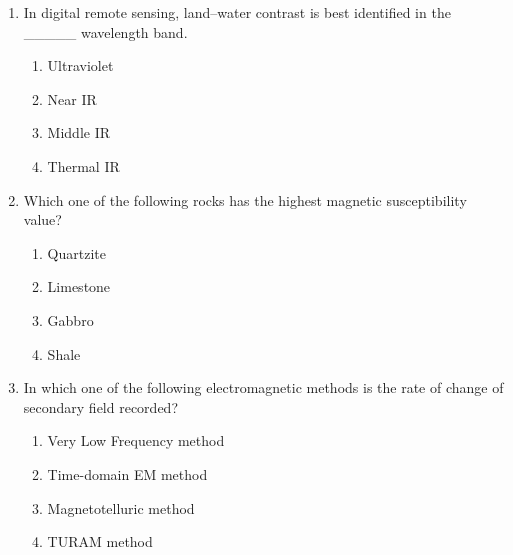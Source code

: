 \documentclass[journal,12pt,onecolumn]{IEEEtran}
\begin{document}
\begin{enumerate}
\begin{enumerate}
\hfill{}

\begin{multicols}{2}
\begin{enumerate}
\item P-2; Q-4; R-1; S-3
\item P-1; Q-2; R-4; S-3
\item P-2; Q-4; R-3; S-1
\item P-4; Q-2; R-1; S-3
\end{enumerate}
\end{multicols}

\item In digital remote sensing, land–water contrast is best identified in the \_\_\_\_\_ wavelength band.

\hfill{}

\begin{multicols}{4}
\begin{enumerate}
\item Ultraviolet
\item Near IR
\item Middle IR
\item Thermal IR
\end{enumerate}
\end{multicols}

\item Which one of the following rocks has the highest magnetic susceptibility value?

\hfill{}

\begin{multicols}{4}
\begin{enumerate}
\item Quartzite
\item Limestone
\item Gabbro
\item Shale
\end{enumerate}
\end{multicols}





\item In which one of the following electromagnetic methods is the rate of change of secondary field recorded?

\hfill{}


\begin{enumerate}
\item Very Low Frequency method
\item Time-domain EM method
\item Magnetotelluric method
\item TURAM method
\end{enumerate}



\end{enumerate}
\end{enumerate}
\end{document}
